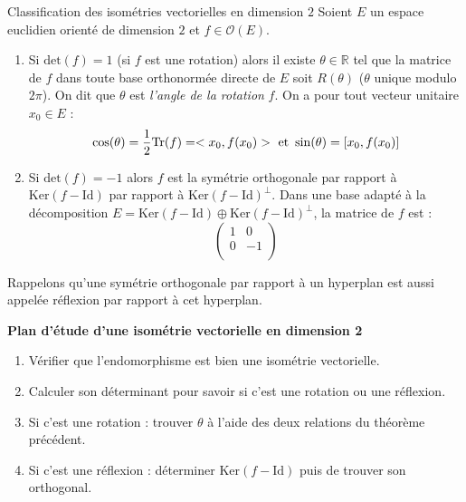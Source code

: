 \documentclass[french,11pt,twoside]{VcCours}
\begin{document}
\begin{Theoreme}{Classification des isométries vectorielles en dimension $2$}
Soient $E$ un espace euclidien orienté de dimension $2$ et $f \in \mathcal{O}(E)$.
\begin{enumerate}
\item Si $\textrm{det}(f)=1$ (si $f$ est une rotation) alors il existe $\theta \in \mathbb{R}$ tel que la matrice de $f$ dans toute base orthonormée directe de $E$ soit $R(\theta)$ ($\theta$ unique modulo $2 \pi$). On dit que $\theta$ est \emph{l'angle de la rotation} $f$. On a pour tout vecteur unitaire $x_0 \in E$ :
$$ \cos(\theta) = \dfrac{1}{2} \textrm{Tr}(f)=<x_0,f(x_0)> \hbox{ et } \sin(\theta) = [x_0, f(x_0) ]$$
\item Si $\textrm{det}(f) = -1$ alors $f$ est la symétrie orthogonale par rapport à $\textrm{Ker}(f-\textrm{Id})$ par rapport à $\textrm{Ker}(f-\textrm{Id})^{\perp}$. Dans une base adapté à la décomposition $E= \textrm{Ker}(f-\textrm{Id}) \oplus \textrm{Ker}(f-\textrm{Id})^{\perp}$, la matrice de $f$ est :
$$ \begin{pmatrix}
1 & 0 \\
0 & -1 \\
\end{pmatrix}$$
\end{enumerate}
\end{Theoreme}

\begin{Remarque}{} Rappelons qu'une symétrie orthogonale par rapport à un hyperplan est aussi appelée réflexion par rapport à cet hyperplan.
\end{Remarque}

\begin{Demonstration}{}

\newpage

\vspace*{5cm}
\end{Demonstration}


\begin{center}
\textbf{Plan d'étude d'une isométrie vectorielle en dimension 2}
\end{center}

\begin{enumerate}
\item Vérifier que l'endomorphisme est bien une isométrie vectorielle.
\item Calculer son déterminant pour savoir si c'est une rotation ou une réflexion.
\item Si c'est une rotation : trouver $\theta$ à l'aide des deux relations du théorème précédent.
\item Si c'est une réflexion : déterminer $\textrm{Ker}(f-\textrm{Id})$ puis de trouver son orthogonal.
\end{enumerate}
\end{document}
